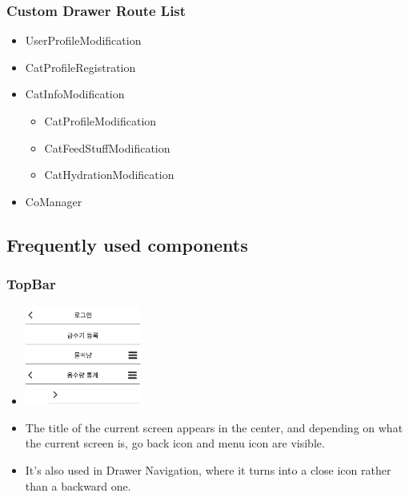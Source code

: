 \documentclass[conference]{IEEEtran}
\begin{document}
\subsubsection{Custom Drawer Route List}
\begin{itemize}
    \item UserProfileModification
    \item CatProfileRegistration
    \item CatInfoModification
    \begin{itemize}
        \item CatProfileModification
        \item CatFeedStuffModification
        \item CatHydrationModification
    \end{itemize}
    \item CoManager\\
\end{itemize}

\subsection{Frequently used components}
\subsubsection{TopBar}
\begin{itemize}
    \item[] \includegraphics[width=0.3\textwidth]{img/Component/1.png}
    \item The title of the current screen appears in the center, and depending on what the current screen is, go back icon and menu icon are visible.
    \item It's also used in Drawer Navigation, where it turns into a close icon rather than a backward one. \\
\end{itemize}
\end{document}

